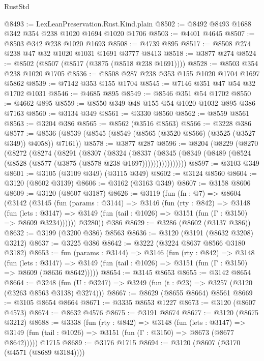 \begin{lexlean}{RustStd}
\begin{coremodule}
@8493 := LexLeanPreservation.Rust.Kind.plain
@8502 := @8492 @8493 @1688 @342 @354 @238 @1020 @1694 @1020 @1706
@8503 := @4401 @4645
@8507 := @8503 @342 @238 @1020 @1693
@8508 := @4739 @895
@8517 := @8508 @274 @238 @47 @32 @1020 @1031 @1691 @3777 @8413
@8518 := @3877 @274
@8524 := @8502 (@8507 (@8517 (@3875 (@8518 @238 @1691))))
@8528 := @8503 @354 @238 @1020 @1705
@8536 := @8508 @287 @238 @353 @155 @1020 @1704 @1697 @5862
@8539 := @7142 @353 @155 @1704
@8545 := @7146 @351 @47 @54 @32 @1702 @1031
@8546 := @4685 @895
@8549 := @8546 @351 @54 @1702
@8550 := @4662 @895
@8559 := @8550 @349 @48 @155 @54 @1020 @1032 @895 @386 @7163
@8560 := @3134 @349
@8561 := @3330 @8560
@8562 := @8559 @8561
@8563 := @3204 @386
@8565 := @8562 (@3516 @8563)
@8566 := @3228 @386
@8577 := @8536 (@8539 (@8545 (@8549 (@8565 (@3520 @8566) (@3525 (@3527 @349)) @4058)) @7161))
@8578 := @3877 @287
@8596 := @8204
    (@8229
      (@8270
        (@8272
          (@8274
            (@8291
              (@8307
                (@8324
                  (@8337
                    (@8345
                      (@8349 (@8489 (@8524 (@8528 (@8577 (@3875 (@8578 @238 @1697))))))))))))))))
@8597 := @3103 @349
@8601 := @3105 (@3109 @349) (@3115 @349)
@8602 := @3124 @8560
@8604 := @3120 (@8602 @3139)
@8606 := @3162 (@3163 @349)
@8607 := @3158 @8606
@8609 := @3120 (@8607 @3187)
@8626 := @3119
    (fun (fn : @7) =>
    @8604
      (@3142
        (@3145
          (fun (params : @3144) =>
          @3146
            (fun (rty : @842) =>
            @3148
              (fun (lets : @3147) =>
              @3149 (fun (tail : @1026) => @3151 (fun (Γ : @3150) => @8609 @3234))))))
        @3280))
    @386
@8629 := @3286 (@8602 (@3137 @386))
@8632 := @3199 (@3200 @386) @8563
@8636 := @3120 (@3191 (@8632 @3208) @3212)
@8637 := @3225 @386
@8642 := @3222 (@3224 @8637 @8566 @3180 @3182)
@8653 := fun (params : @3144) =>
  @3146
    (fun (rty : @842) =>
    @3148
      (fun (lets : @3147) =>
      @3149 (fun (tail : @1026) => @3151 (fun (Γ : @3150) => @8609 (@8636 @8642)))))
@8654 := @3145 @8653
@8655 := @3142 @8654
@8664 := @3248 (fun (U : @3247) => @3249 (fun (t : @23) => @3257 (@3120 (@3263 @8563 @3138) @3274)))
@8667 := @8629 (@8655 @8664) @8561
@8669 := @3105 @8654 @8664
@8671 := @3335 @8653 @1227
@8673 := @3120 (@8607 @4573)
@8674 := @8632 @4576
@8675 := @3191 @8674
@8677 := @3120 (@8675 @3212)
@8688 := @3338
    (fun (rty : @842) =>
    @3148
      (fun (lets : @3147) =>
      @3149 (fun (tail : @1026) => @3151 (fun (Γ : @3150) => @8673 (@8677 @8642)))))
    @1715
@8689 := @3176 @1715
@8694 := @3120 (@8607 (@3170 (@4571 (@8689 @3184))))

\end{coremodule}
\end{lexlean}
